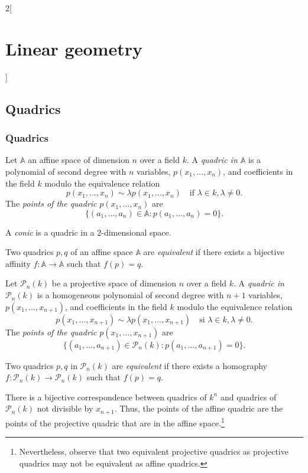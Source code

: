 \documentclass[class=article,10pt,crop=false]{standalone}
\begin{document}
\begin{multicols}{2}[\section{Linear geometry}]
\subsection{Quadrics}
\subsubsection*{Quadrics}
\begin{definition}
Let $\mathbb{A}$ an affine space of dimension $n$ over a field $k$. A \textit{quadric in $\mathbb{A}$} is a polynomial of second degree with $n$ variables, $p(x_1,\ldots,x_n)$, and coefficients in the field $k$ modulo the equivalence relation $$p(x_1,\ldots,x_n)\sim\lambda p(x_1,\ldots,x_n)\quad\text{if }\lambda\in k,\lambda\ne0.$$ The \textit{points of the quadric} $p(x_1,\ldots,x_n)$ are $$\{(a_1,\ldots,a_n)\in\mathbb{A}:p(a_1,\ldots,a_n)=0\}.$$
\end{definition}
\begin{definition}
A \textit{conic} is a quadric in a 2-dimensional space.
\end{definition}
\begin{definition}
Two quadrics $p,q$ of an affine space $\mathbb{A}$ are \textit{equivalent} if there exists a bijective affinity $f:\mathbb{A}\rightarrow\mathbb{A}$ such that $f(p)=q$.
\end{definition}
\begin{definition}
Let $\mathcal{P}_n(k)$ be a projective space of dimension $n$ over a field $k$. A \textit{quadric in $\mathcal{P}_n(k)$} is a homogeneous polynomial of second degree with $n+1$ variables, $p(x_1,\ldots,x_{n+1})$, and coefficients in the field $k$ modulo the equivalence relation $$p(x_1,\ldots,x_{n+1})\sim\lambda p(x_1,\ldots,x_{n+1})\quad\text{si }\lambda\in k,\lambda\ne0.$$ The \textit{points of the quadric} $p(x_1,\ldots,x_{n+1})$ are $$\{(a_1,\ldots,a_{n+1})\in\mathcal{P}_n(k):p(a_1,\ldots,a_{n+1})=0\}.$$
\end{definition}
\begin{definition}
Two quadrics $p,q$ in $\mathcal{P}_n(k)$ are \textit{equivalent} if there exists a homography $f:\mathcal{P}_n(k)\rightarrow\mathcal{P}_n(k)$ such that $f(p)=q$.
\end{definition}
\begin{theorem}
There is a bijective correspondence between quadrics of $k^n$ and quadrics of $\mathcal{P}_n(k)$ not divisible by $x_{n+1}$. Thus, the points of the affine quadric are the points of the projective quadric that are in the affine space.\footnote{Nevertheless, observe that two equivalent projective quadrics as projective quadrics may not be equivalent as affine quadrics.}

\end{theorem}
\end{multicols}
\end{document}
